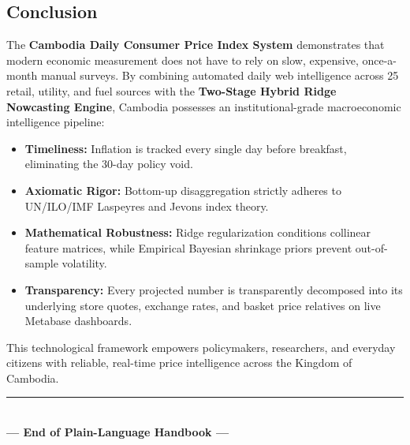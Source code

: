 \documentclass[11pt,a4paper,oneside]{article}
\begin{document}
\subsection{Conclusion}
The \textbf{Cambodia Daily Consumer Price Index System} demonstrates that modern economic measurement does not have to rely on slow, expensive, once-a-month manual surveys. By combining automated daily web intelligence across 25 retail, utility, and fuel sources with the \textbf{Two-Stage Hybrid Ridge Nowcasting Engine}, Cambodia possesses an institutional-grade macroeconomic intelligence pipeline:
\begin{itemize}[noitemsep]
    \item \textbf{Timeliness:} Inflation is tracked every single day before breakfast, eliminating the 30-day policy void.
    \item \textbf{Axiomatic Rigor:} Bottom-up disaggregation strictly adheres to UN/ILO/IMF Laspeyres and Jevons index theory.
    \item \textbf{Mathematical Robustness:} Ridge regularization conditions collinear feature matrices, while Empirical Bayesian shrinkage priors prevent out-of-sample volatility.
    \item \textbf{Transparency:} Every projected number is transparently decomposed into its underlying store quotes, exchange rates, and basket price relatives on live Metabase dashboards.
\end{itemize}
This technological framework empowers policymakers, researchers, and everyday citizens with reliable, real-time price intelligence across the Kingdom of Cambodia.

\vspace{1.5cm}
\begin{center}
\rule{0.6\textwidth}{0.4pt}\\
\vspace{0.4cm}
\textbf{--- End of Plain-Language Handbook ---}
\end{center}
\end{document}
